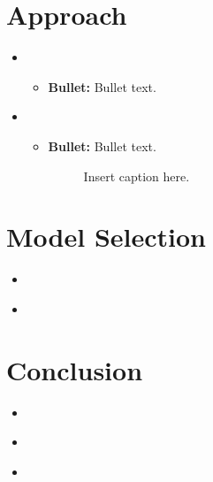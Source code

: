 \section{Approach}
\medskip
\begin{itemize}

    \item {}
    \begin{itemize}
    \item \textbf{Bullet:} Bullet text.
    \end{itemize}

    \item {}
    \begin{itemize}
    \item \textbf{Bullet:} Bullet text.

    \begin{figure}[H]
    \centering
    \caption{Insert caption here.}
    \end{figure}

    \end{itemize}

\end{itemize}



\section{Model Selection}
\medskip
\begin{itemize}

    \item {} \\

    \item {} \\

\end{itemize}



\section{Conclusion}
\medskip
\begin{itemize}

    \item {} \\

    \item {} \\

    \item {} \\

\end{itemize}




